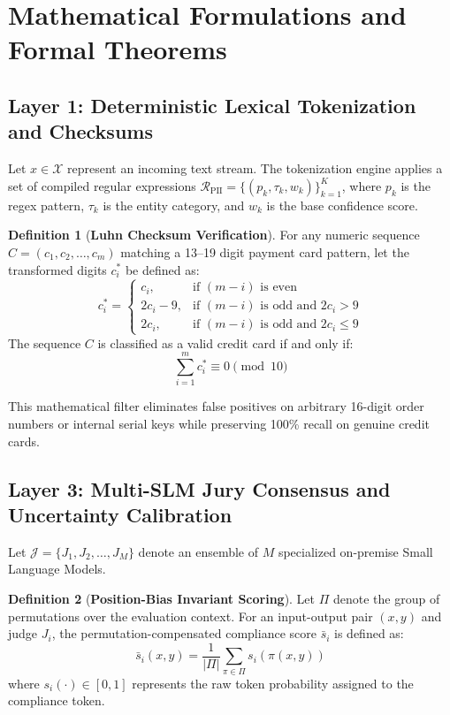 \documentclass[11pt,a4paper]{article}
\theoremstyle{definition}
\newtheorem{definition}{Definition}
\begin{document}
\section{Mathematical Formulations and Formal Theorems}
\label{sec:math}

\subsection{Layer 1: Deterministic Lexical Tokenization and Checksums}
Let $x \in \mathcal{X}$ represent an incoming text stream. The tokenization engine applies a set of compiled regular expressions $\mathcal{R}_{\text{PII}} = \{(p_k, \tau_k, w_k)\}_{k=1}^K$, where $p_k$ is the regex pattern, $\tau_k$ is the entity category, and $w_k$ is the base confidence score.

\begin{definition}[\textbf{Luhn Checksum Verification}]
For any numeric sequence $C = (c_1, c_2, \dots, c_m)$ matching a 13--19 digit payment card pattern, let the transformed digits $c_i^*$ be defined as:
\begin{equation}
    c_i^* = 
    \begin{cases}
        c_i, & \text{if } (m - i) \text{ is even} \\
        2 c_i - 9, & \text{if } (m - i) \text{ is odd and } 2 c_i > 9 \\
        2 c_i, & \text{if } (m - i) \text{ is odd and } 2 c_i \le 9
    \end{cases}
\end{equation}
The sequence $C$ is classified as a valid credit card if and only if:
\begin{equation}
    \sum_{i=1}^m c_i^* \equiv 0 \pmod{10}
\end{equation}
\end{definition}

This mathematical filter eliminates false positives on arbitrary 16-digit order numbers or internal serial keys while preserving 100\% recall on genuine credit cards.

\subsection{Layer 3: Multi-SLM Jury Consensus and Uncertainty Calibration}

Let $\mathcal{J} = \{J_1, J_2, \dots, J_M\}$ denote an ensemble of $M$ specialized on-premise Small Language Models.

\begin{definition}[\textbf{Position-Bias Invariant Scoring}]
Let $\Pi$ denote the group of permutations over the evaluation context. For an input-output pair $(x, y)$ and judge $J_i$, the permutation-compensated compliance score $\bar{s}_i$ is defined as:
\begin{equation}
    \bar{s}_i(x, y) = \frac{1}{|\Pi|} \sum_{\pi \in \Pi} s_i\left( \pi(x, y) \right)
\end{equation}
where $s_i(\cdot) \in [0, 1]$ represents the raw token probability assigned to the compliance token.
\end{definition}
\end{document}
